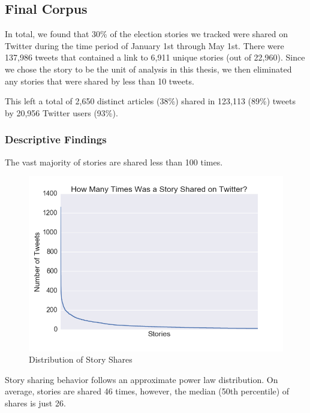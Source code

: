 \documentclass[letterpaper]{article}
\begin{document}
{\subsection{Final Corpus}

In total, we found that 30\% of the election stories we tracked were shared on Twitter during the time period of January 1st through May 1st. There were 137,986 tweets that contained a link to 6,911 unique stories (out of 22,960). Since we chose the story to be the unit of analysis in this thesis, we then eliminated any stories that were shared by less than 10 tweets.

This left a total of 2,650 distinct articles (38\%) shared in 123,113 (89\%) tweets by 20,956 Twitter users (93\%).

\subsubsection{Descriptive Findings}
The vast majority of stories are shared less than 100 times. 

\begin{figure}[t!]
\centering 
  \includegraphics[width=\columnwidth]{story-share-dist}  
  \caption{Distribution of Story Shares
    \label{fig:story-share-dist}}
\end{figure} 


Story sharing behavior follows an approximate power law distribution. On average, stories are shared 46 times, however, the median (50th percentile) of shares is just 26. 


}
\end{document}
